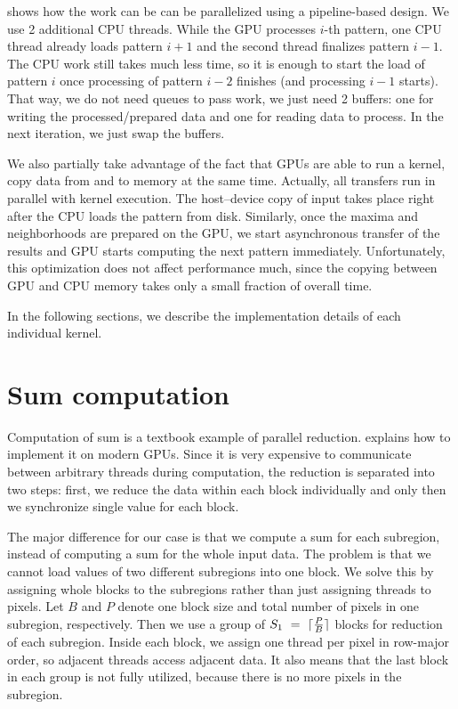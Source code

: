  shows how the work can be can be parallelized using a pipeline-based design. We use 2 additional CPU threads. While the GPU processes $i$-th pattern, one CPU thread already loads pattern $i+1$ and the second thread finalizes pattern $i-1$. The CPU work still takes much less time, so it is enough to start the load of pattern $i$ once processing of pattern $i-2$ finishes (and processing $i-1$ starts). That way, we do not need queues to pass work, we just need 2 buffers: one for writing the processed/prepared data and one for reading data to process. In the next iteration, we just swap the buffers.

We also partially take advantage of the fact that GPUs are able to run a kernel, copy data from and to memory at the same time. Actually, all transfers run in parallel with kernel execution. The host--device copy of input takes place right after the CPU loads the pattern from disk. Similarly, once the maxima and neighborhoods are prepared on the GPU, we start asynchronous transfer of the results and GPU starts computing the next pattern immediately. Unfortunately, this optimization does not affect performance much, since the copying between GPU and CPU memory takes only a small fraction of overall time.

In the following sections, we describe the implementation details of each individual kernel.




\section{Sum computation}
\label{sums}

Computation of sum is a textbook example of parallel reduction. \cite{parallelReduction} explains how to implement it on modern GPUs. Since it is very expensive to communicate between arbitrary threads during computation, the reduction is separated into two steps: first, we reduce the data within each block individually and only then we synchronize single value for each block.

The major difference for our case is that we compute a sum for each subregion, instead of computing a sum for the whole input data. The problem is that we cannot load values of two different subregions into one block. We solve this by assigning whole blocks to the subregions rather than just assigning threads to pixels. Let $B$ and $P$ denote one block size and total number of pixels in one subregion, respectively. Then we use a group of $S_1~=~\lceil\frac{P}{B}\rceil$ blocks for reduction of each subregion. Inside each block, we assign one thread per pixel in row-major order, so adjacent threads access adjacent data. It also means that the last block in each group is not fully utilized, because there is no more pixels in the subregion.

